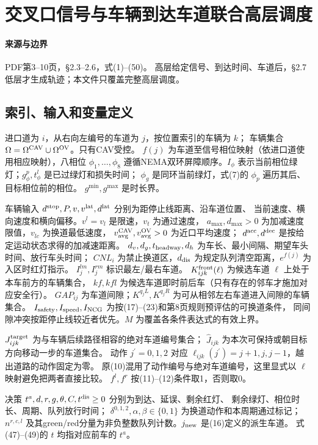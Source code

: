 \documentclass[UTF8,11pt]{ctexart}
\begin{document}
\section*{交叉口信号与车辆到达车道联合高层调度}

\paragraph{来源与边界} PDF第3--10页，§2.3--2.6，式(1)--(50)。
高层给定信号、到达时间、车道后，§2.7低层才生成轨迹；本文件只覆盖完整高层调度。
\subsection*{索引、输入和变量定义}
进口道为 $i$，从右向左编号的车道为 $j$，按位置索引的车辆为 $k$；
车辆集合 $\Omega=\Omega^{\rm CAV}\cup\Omega^{\rm OV}$。只有CAV受控。
$f(j)$ 为车道至信号相位映射（依进口道使用相应映射），八相位 $\phi_1,\ldots,\phi_8$
遵循NEMA双环屏障顺序。$I_\phi$ 表示当前相位绿灯；$g_\phi^p,t_\phi^l$ 是已过绿灯和损失时间；
$\phi_g$ 是同环当前绿灯，式(7)的 $\phi_p$ 遍历其后、目标相位前的相位。
$g^{\min},g^{\max}$ 是时长界。

车辆输入 $d^{\rm stop},P,v,v^{\rm lat},d^{\rm lat}$ 分别为距停止线距离、沿车道位置、
当前速度、横向速度和横向偏移。$v^l=v_l$ 是限速，$v_t$ 为通过速度，
$a_{\max},d_{\max}>0$ 为加减速度限值，$v_{lc}$ 为换道最低速度，
$v_{\rm avg}^{\rm CAV},v_{\rm avg}^{\rm OV}>0$ 为近口平均速度；
$d^{\rm acc},d^{\rm dec}$ 是按给定运动状态求得的加减速距离。
$d_v,d_g,t_{\rm headway},d_h$ 为车长、最小间隔、期望车头时间、放行车头时间；
$CNL_i$ 为禁止换道区，$d_{\rm dis}$ 为规定队列清空距离，$e^{f(j)}$ 为入区时红灯指示。
$I_j^{lm},I_j^{rm}$ 标识最左/最右车道。
$K^{\rm front}_{ijk}(\ell)$ 为候选车道 $\ell$ 上处于本车前方的车辆集合，
$kf,kfl$ 为候选车道即时前后车（只有存在的邻车才施加对应安全行）。
$GAP_{ij}$ 为车道间隙；$K^{q_jL},K^{q_jR}$ 为可从相邻左右车道进入间隙的车辆集合。
$I_{\rm safety},I_{\rm speed},I_{\rm NCG}$ 为按(17)--(23)和第8页规则预评估的可换道条件，
同间隙冲突按距停止线较近者优先。$M$ 为覆盖各条件表达式的有效上界。

$J^{\rm target}_{ijk}$ 为与车辆后续路径相容的绝对车道编号集合；
$\widehat J_{ijk}$ 为本次可保持或朝目标方向移动一步的车道集合。
动作 $j^{\prime}=0,1,2$ 对应 $\ell_{ijk}(j^{\prime})=j+1,j,j-1$，越出道路的动作固定为零。
原(10)混用了动作编号与绝对车道编号，这里显式以 $\ell$ 映射避免把两者直接比较。
$f^l,f^r$ 按(11)--(12)条件取1，否则取0。

决策 $t^a,d,r,g,\theta,C,t^{\rm dis}\ge0$ 分别为到达、延误、剩余红灯、
剩余绿灯、相位时长、周期、队列放行时间；
$\delta^{0,1,2},\alpha,\beta\in\{0,1\}$ 为换道动作和本周期通过标记；
$n^{r,c,l}$ 及其green/red分量为非负整数队列计数。$j_{\rm new}$ 是(16)定义的派生车道。
式(47)--(49)的 $t$ 均指对应前车的 $t^a$。
\end{document}
